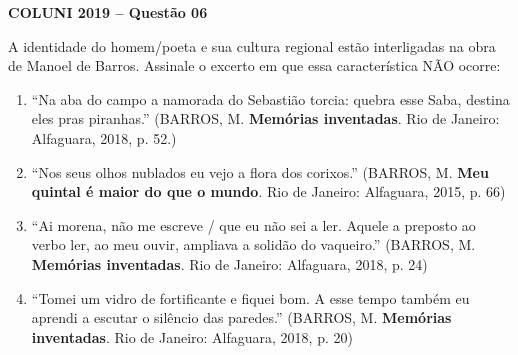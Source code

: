 \textbf{COLUNI 2019 -- Questão 06}\par\medskip A identidade do homem/poeta e sua cultura regional estão interligadas na obra de Manoel de Barros. Assinale o excerto em que essa característica NÃO ocorre:\begin{enumerate}
\item “Na aba do campo a namorada do Sebastião torcia: quebra esse Saba, destina eles pras piranhas.”
      (BARROS, M. \textbf{Memórias inventadas}. Rio de Janeiro: Alfaguara, 2018, p. 52.)
\item “Nos seus olhos nublados eu vejo a flora dos corixos.” (BARROS, M. \textbf{Meu quintal é maior do que o mundo}. Rio de Janeiro:
      Alfaguara, 2015, p. 66)
\item “Ai morena, não me escreve / que eu não sei a ler. Aquele a preposto ao verbo ler, ao meu ouvir, ampliava
      a solidão do vaqueiro.” (BARROS, M. \textbf{Memórias inventadas}. Rio de Janeiro: Alfaguara, 2018, p. 24)
\item “Tomei um vidro de fortificante e fiquei bom. A esse tempo também eu aprendi a escutar o silêncio das
      paredes.” (BARROS, M. \textbf{Memórias inventadas}. Rio de Janeiro: Alfaguara, 2018, p. 20)\end{enumerate}
